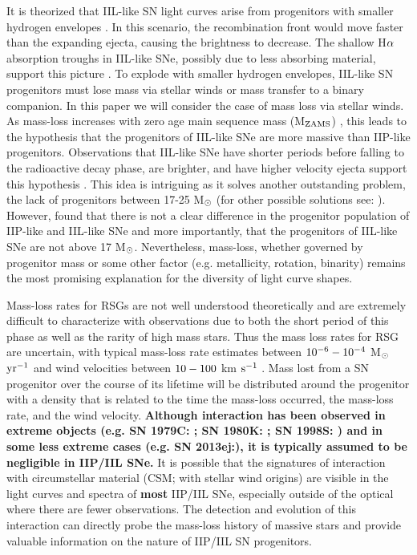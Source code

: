 \documentclass[a4paper,fleqn,usenatbib]{mnras}
\newcommand{\msun}{M$\rm{_{\odot}}$ }
\newcommand{\msunperiod}{M$\rm{_{\odot}}$}
\begin{document}
It is theorized that IIL-like SN light curves arise from progenitors with  smaller hydrogen envelopes \citep{1971grassberg,1989branch,1993blinnikov}.
In this scenario, the recombination front would move faster than the expanding ejecta, causing the brightness to decrease. 
The shallow H$\rm{\alpha}$ absorption troughs in IIL-like SNe, possibly due to less absorbing material, support this picture \citep{1996schlegel,2014gutierrez}.
To explode with smaller hydrogen envelopes, IIL-like SN progenitors must lose mass via stellar winds or mass transfer to a binary companion.
In this paper we will consider the case of mass loss via stellar winds.
As mass-loss increases with zero age main sequence mass (M$\rm{_{ZAMS}}$)  \citep{2003heger,2009kasen}, this leads to the hypothesis that the progenitors of IIL-like SNe are more massive than IIP-like progenitors. 
Observations that IIL-like SNe have shorter periods before falling to the radioactive decay phase, are brighter, and have higher velocity ejecta support this hypothesis \citep{1994patat,2014gutierrez,2014anderson,2014faran,2015sanders,2015valenti,2016valenti}.
This idea is intriguing as it solves another outstanding problem, the lack of progenitors between 17-25 \msun \citep{2015smartt} (for other possible solutions see: \citealt{2018davies, 2012walmswell}).
However, \citet{2016valenti} found that there is not a clear difference in the progenitor population of IIP-like and IIL-like SNe and more importantly, that the progenitors of IIL-like SNe are not above 17 \msunperiod.
Nevertheless, mass-loss, whether governed by progenitor mass or some other factor (e.g. metallicity, rotation, binarity) remains the most promising explanation for the diversity of light curve shapes.

Mass-loss rates for RSGs are not well understood theoretically and are extremely difficult to characterize with observations due to both the short period of this phase as well as the rarity of high mass stars.
Thus the mass loss rates for RSG are uncertain, with typical mass-loss rate estimates between $\rm{10^{-6}-10^{-4}}$ \msunperiod $\rm{yr^{-1}}$ and wind velocities between $\rm{10-100}$ km $\rm{s^{-1}}$ \citep{2011mauron}.
Mass lost from a SN progenitor over the course of its lifetime will be distributed around the progenitor with a density that is related to the time the mass-loss occurred, the mass-loss rate, and the wind velocity.
\textbf{Although interaction has been observed in extreme objects (e.g. SN 1979C: \citealt{1993blinnikov}; SN 1980K: \citealt{1992chugai}; SN 1998S: \citealt{2001chugai}) and in some less extreme cases (e.g. SN 2013ej:\citealt{2017utrobin}), it is typically assumed to be negligible in IIP/IIL SNe.}
It is possible that the signatures of interaction with circumstellar material (CSM; with stellar wind origins) are visible in the light curves and spectra of \textbf{most} IIP/IIL SNe, especially outside of the optical where there are fewer observations.
The detection and evolution of this interaction can directly probe the mass-loss history of massive stars and provide valuable information on the nature of IIP/IIL SN progenitors.
\end{document}
